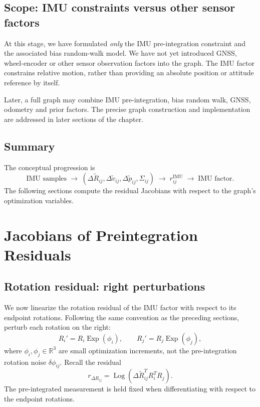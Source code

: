 \documentclass[11pt,a4paper]{article}
\newcommand{\Exp}{\operatorname{Exp}}
\newcommand{\Log}{\operatorname{Log}}
\begin{document}
\subsection{Scope: IMU constraints versus other sensor factors}
At this stage, we have formulated \emph{only} the IMU pre-integration
constraint and the associated bias random-walk model. We have not yet
introduced GNSS, wheel-encoder or other sensor observation factors
into the graph. The IMU factor constrains relative motion, rather
than providing an absolute position or attitude reference by itself.

Later, a full graph may combine IMU pre-integration, bias random walk,
GNSS, odometry and prior factors. The precise graph construction and
implementation are addressed in later sections of the chapter.

\subsection{Summary}
The conceptual progression is
\[
\boxed{\text{IMU samples}\;\longrightarrow\;
(\Delta\tilde R_{ij},\Delta\tilde v_{ij},\Delta\tilde p_{ij},\Sigma_{ij})
\;\longrightarrow\;r_{ij}^{\mathrm{IMU}}
\;\longrightarrow\;\text{IMU factor}.}
\]
The following sections compute the residual Jacobians with respect to
the graph's optimization variables.


\section{Jacobians of Preintegration Residuals}
\subsection{Rotation residual: right perturbations}
We now linearize the rotation residual of the IMU factor with respect to
its endpoint rotations. Following the same convention as the preceding
sections, perturb each rotation on the right:
\begin{equation}
R_i' = R_i\Exp(\phi_i),\qquad
R_j' = R_j\Exp(\phi_j),
\end{equation}
where $\phi_i,\phi_j\in\mathbb R^3$ are small optimization increments,
not the pre-integration rotation noise $\delta\phi_{ij}$.
Recall the residual
\begin{equation}\label{eq:resrot_jac_base}
r_{\Delta R_{ij}}=\Log\!\left(\Delta\tilde R_{ij}^{T}R_i^TR_j\right).
\end{equation}
The pre-integrated measurement is held fixed when differentiating with
respect to the endpoint rotations.
\end{document}
